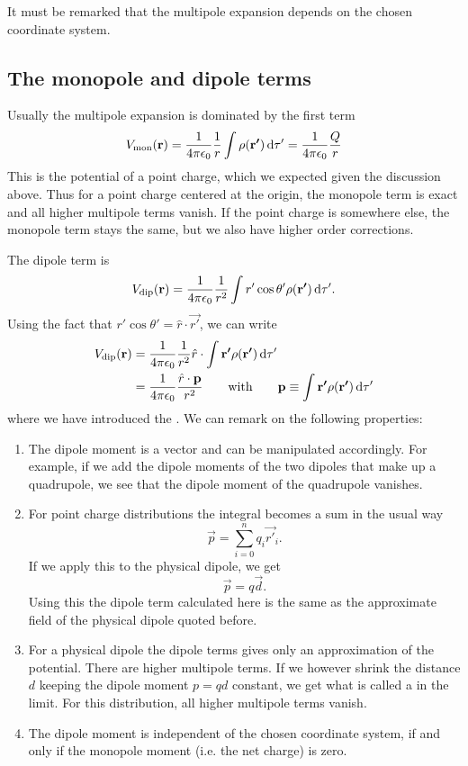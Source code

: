 It must be remarked that the multipole expansion depends on the chosen coordinate system.

\subsection{The monopole and dipole terms}
Usually the multipole expansion is dominated by the first term
\[ V_\text{mon}(\bm{\mathrm{r}}) = \frac{1}{4\pi\epsilon_0}\frac{1}{r}\int \rho(\bm{\mathrm{r'}})\operatorname{d \!}{\tau'} = \frac{1}{4\pi\epsilon_0}\frac{Q}{r} \]
This is the potential of a point charge, which we expected given the discussion above. Thus for a point charge centered at the origin, the monopole term is exact and all higher multipole terms vanish. If the point charge is somewhere else, the monopole term stays the same, but we also have higher order corrections.

The dipole term is
\[ V_\text{dip}(\bm{\mathrm{r}}) = \frac{1}{4\pi\epsilon_0}\frac{1}{r^2}\int r'\cos\theta'\rho(\bm{\mathrm{r'}})\operatorname{d \!}{\tau'}. \]
Using the fact that $r'\cos\theta'= \hat{r}\cdot \vec{r'}$, we can write
\begin{align*}
V_\text{dip}(\bm{\mathrm{r}}) &= \frac{1}{4\pi\epsilon_0}\frac{1}{r^2}\hat{r}\cdot\int \bm{\mathrm{r'}}\rho(\bm{\mathrm{r'}})\operatorname{d \!}{\tau'}\\
&= \frac{1}{4\pi\epsilon_0}\frac{\hat{r}\cdot \bm{\mathrm{p}}}{r^2}\qquad \text{with}\qquad \bm{\mathrm{p}} \equiv \int \bm{\mathrm{r'}}\rho(\bm{\mathrm{r'}})\operatorname{d \!}{\tau'}
\end{align*}
where we have introduced the . We can remark on the following properties:
\begin{enumerate}
\item The dipole moment is a vector and can be manipulated accordingly. For example, if we add the dipole moments of the two dipoles that make up a quadrupole, we see that the dipole moment of the quadrupole vanishes.
\item For point charge distributions the integral becomes a sum in the usual way
\[ \vec{p} = \sum^n_{i=0} q_i \vec{r'}_i. \]
If we apply this to the physical dipole, we get
\[ \vec{p} = q \vec{d}. \]
Using this the dipole term calculated here is the same as the approximate field of the physical dipole quoted before.
\item For a physical dipole the dipole terms gives only an approximation of the potential. There are higher multipole terms. If we however shrink the distance $d$ keeping the dipole moment $p = qd$ constant, we get what is called a  in the limit. For this distribution, all higher multipole terms vanish.
\item The dipole moment is independent of the chosen coordinate system, if and only if the monopole moment (i.e. the net charge) is zero.
\end{enumerate}

